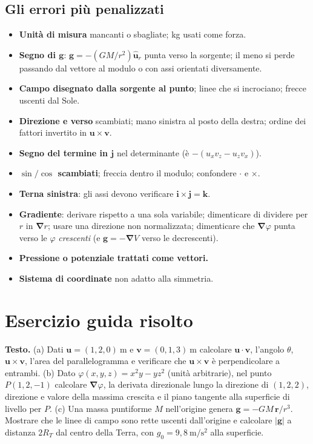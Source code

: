 \documentclass[11pt,a4paper]{article}
\newcommand{\vv}[1]{\mathbf{#1}}
\newcommand{\ur}{\hat{\mathbf{u}}_r}
\newcommand{\mo}[1]{\left|#1\right|}
\newcommand{\unit}[1]{\ \mathrm{#1}}
\newcommand{\nab}{\boldsymbol{\nabla}}
\begin{document}
\subsection{Gli errori più penalizzati}
\begin{itemize}[nosep]
\item \textbf{Unità di misura} mancanti o sbagliate; kg usati come forza.
\item \textbf{Segno di $\vv g$}: $\vv g=-(GM/r^2)\ur$ punta verso la sorgente; il meno si perde passando dal vettore al modulo o con assi orientati diversamente.
\item \textbf{Campo disegnato dalla sorgente al punto}; linee che si incrociano; frecce uscenti dal Sole.
\item \textbf{Direzione e verso} scambiati; mano sinistra al posto della destra; ordine dei fattori invertito in $\vv u\times\vv v$.
\item \textbf{Segno del termine in $\vv j$} nel determinante (è $-(u_xv_z-u_zv_x)$).
\item \textbf{$\sin/\cos$ scambiati}; freccia dentro il modulo; confondere $\cdot$ e $\times$.
\item \textbf{Terna sinistra}: gli assi devono verificare $\vv i\times\vv j=\vv k$.
\item \textbf{Gradiente}: derivare rispetto a una sola variabile; dimenticare di dividere per $r$ in $\nab r$; usare una direzione non normalizzata; dimenticare che $\nab\varphi$ punta verso le $\varphi$ \emph{crescenti} (e $\vv g=-\nab V$ verso le decrescenti).
\item \textbf{Pressione o potenziale trattati come vettori.}
\item \textbf{Sistema di coordinate} non adatto alla simmetria.
\end{itemize}

\section{Esercizio guida risolto}
\textbf{Testo.} (a) Dati $\vv u=(1,2,0)\unit m$ e $\vv v=(0,1,3)\unit m$ calcolare $\vv u\cdot\vv v$, l'angolo $\theta$, $\vv u\times\vv v$, l'area del parallelogramma e verificare che $\vv u\times\vv v$ è perpendicolare a entrambi.
(b) Dato $\varphi(x,y,z)=x^2y-yz^2$ (unità arbitrarie), nel punto $P(1,2,-1)$ calcolare $\nab\varphi$, la derivata direzionale lungo la direzione di $(1,2,2)$, direzione e valore della massima crescita e il piano tangente alla superficie di livello per $P$.
(c) Una massa puntiforme $M$ nell'origine genera $\vv g=-GM\,\vv r/r^3$. Mostrare che le linee di campo sono rette uscenti dall'origine e calcolare $\mo{\vv g}$ a distanza $2R_T$ dal centro della Terra, con $g_0=9{,}8\unit{m/s^2}$ alla superficie.
\end{document}
